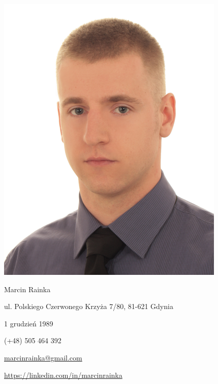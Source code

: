 \documentclass[11pt,a4paper]{article}
\begin{document}
    \pagestyle{empty}
  
    \noindent
    \begin{minipage}[b]{0.4\textwidth}
        \begin{center}
            \includegraphics{photo.png}
        \end{center}
    \end{minipage}
    \begin{minipage}[b]{0.6\textwidth}
        {\Huge \sc Marcin Rainka}
        \begin{description} \itemsep2pt \parskip0pt 
            \item[Adres] ul. Polskiego Czerwonego Krzyża 7/80, 81-621 Gdynia
            \item[Data urodzenia] 1 grudzień 1989
            \item[Telefon] (+48) 505 464 392
            \item[E-mail] \href{mailto:marcinrainka@gmail.com}{marcinrainka@gmail.com}
            \item[LinkedIn] \url{https://linkedin.com/in/marcinrainka}
        \end{description}
    \end{minipage}
  
    \vspace{0.1cm}
  
\end{document}
